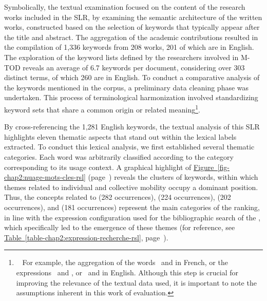 \begin{refsegment}
Symbolically, the textual examination focused on the content of the research works included in the \acrshort{SLR}, by examining the semantic architecture of the written works, constructed based on the selection of keywords that typically appear after the title and abstract. The aggregation of the academic contributions resulted in the compilation of 1,336 keywords from 208 works, 201 of which are in English. The exploration of the keyword lists defined by the researchers involved in \acrshort{M-TOD} reveals an average of 6.7 keywords per document, considering over 303 distinct terms, of which 260 are in English. To conduct a comparative analysis of the keywords mentioned in the corpus, a preliminary data cleaning phase was undertaken. This process of terminological harmonization involved standardizing keyword sets that share a common origin or related meaning\footnote{~
    For example, the aggregation of the words ~and  in French, or the expressions ~and , or ~and  in English. Although this step is crucial for improving the relevance of the textual data used, it is important to note the assumptions inherent in this work of evaluation.
}.%

By cross-referencing the 1,281 English keywords, the textual analysis of this \acrshort{SLR} highlights eleven thematic aspects that stand out within the lexical labels extracted. To conduct this lexical analysis, we first established several thematic categories. Each word was arbitrarily classified according to the category corresponding to its usage context. A graphical highlight of \hyperref[fig-chap2:nuage-mots-cles-rsl]{Figure~\ref{fig-chap2:nuage-mots-cles-rsl}} (page~\pageref{fig-chap2:nuage-mots-cles-rsl}) reveals the clusters of keywords, within which themes related to individual and collective mobility occupy a dominant position. Thus, the concepts related to  (282 occurrences),  (224 occurrences),  (202 occurrences), and  (181 occurrences) represent the main categories of the ranking, in line with the expression configuration used for the bibliographic search of the , which specifically led to the emergence of these themes (for reference, see \hyperref[table-chap2:expression-recherche-rsl]{Table~\ref{table-chap2:expression-recherche-rsl}}, page~\pageref{table-chap2:expression-recherche-rsl}).%


\end{refsegment}
